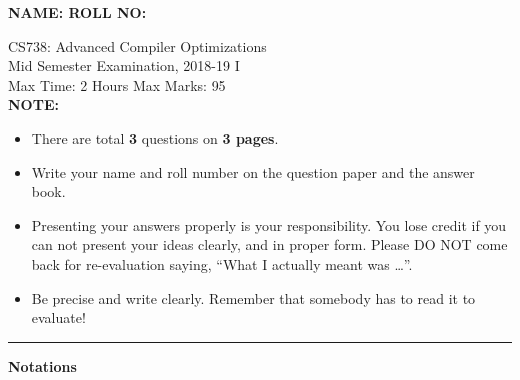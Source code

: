\documentclass[12pt]{article}
\begin{document}
{\Large\bf NAME: \hspace*{3in} ROLL NO:}

\begin{center}
CS738: Advanced Compiler Optimizations \\
Mid Semester Examination, 2018-19 I\\
Max Time: 2 Hours  \hfill Max Marks: {95} \\

{\bf NOTE: }
\begin{itemize}
\item There are total {\bf 3} questions on {\bf 3 pages}.
\item Write your name and roll number on the question paper and the
  answer book.
\item Presenting your answers properly is your
  responsibility. You lose credit if you can not present your
  ideas clearly, and in proper form. Please DO NOT come back
  for re-evaluation saying, ``What I actually meant was
  \ldots''.
\item Be precise and write clearly. Remember that somebody
  has to read it to evaluate!
\end{itemize}
\hrule
\end{center}


\newcommand{\pt}{\ensuremath{\pi}}
\newcommand{\fgentry}{{\sf Entry}}
\newcommand{\fgexit}{{\sf Exit}}
\begin{center}
  \Large\bf Notations
\end{center}
\newcommand{\indef}[2]{\ensuremath{{\sf BeforeIN}(#1, #2)}}
\newcommand{\outdef}[2]{\ensuremath{{\sf BeforeOut}(#1, #2)}}
\newcommand{\inuse}[2]{\ensuremath{{\sf AfterIN}(#1, #2)}}
\newcommand{\outuse}[2]{\ensuremath{{\sf AfterOut}(#1, #2)}}
\newcommand{\inacc}[2]{\ensuremath{{\sf AccIN}(#1, #2)}}
\newcommand{\outacc}[2]{\ensuremath{{\sf AccOUT}(#1, #2)}}
\newcommand{\inaccset}[2]{\ensuremath{{\sf AccSetIN}(#1, #2)}}
\newcommand{\outaccset}[2]{\ensuremath{{\sf AccSetOUT}(#1, #2)}}
\newcommand{\IN}[1]{\ensuremath{{\sf IN}(#1)}}
\newcommand{\OUT}[1]{\ensuremath{{\sf OUT}(#1)}}
\newcommand{\Pred}[1]{\ensuremath{{\sf PRED}(#1)}}
\newcommand{\Succ}[1]{\ensuremath{{\sf SUCC}(#1)}}
\newcommand{\cpath}{\ensuremath{\stackrel{+}{\longrightarrow}}}
\newcommand{\idfp}{\ensuremath{\mbox{DF}^+}}
\end{document}
